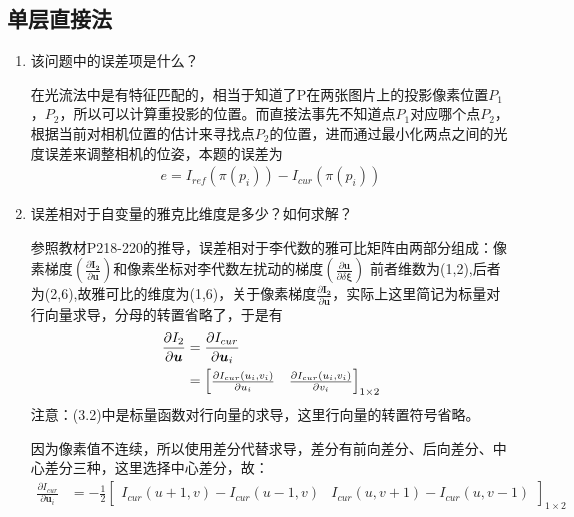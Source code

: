 \documentclass[40pt,a4paper，UTF8]{ctexart}
\numberwithin{equation}{section}
\begin{document}
\subsection{单层直接法}
\begin{enumerate}
\item 该问题中的误差项是什么？

在光流法中是有特征匹配的，相当于知道了P在两张图片上的投影像素位置$P_1$，$P_2$，所以可以计算重投影的位置。而直接法事先不知道点$P_1$对应哪个点$P_2$，根据当前对相机位置的估计来寻找点$P_2$的位置，进而通过最小化两点之间的光度误差来调整相机的位姿，本题的误差为
\begin{align}
e=I_{ref}(\pi (p_i))-I_{cur}(\pi (p_i))
\end{align}

\item 误差相对于自变量的雅克比维度是多少？如何求解？

参照教材P218-220的推导，误差相对于李代数的雅可比矩阵由两部分组成：像素梯度$(\frac{\partial \bm{I_2}}{\partial \bm{u}})$和像素坐标对李代数左扰动的梯度$(\frac{\partial \bm u}{\partial \delta \bm \xi})$
前者维数为(1,2),后者为(2,6),故雅可比的维度为(1,6)，关于像素梯度$\frac{\partial \bm{I_2}}{\partial \bm{u}}$，实际上这里简记为标量对行向量求导，分母的转置省略了，于是有
\begin{align}
\frac{\partial I_2}{\partial \bm{u}} &= 
\frac{\partial  I_{cur}}{\partial \bm u_i} \notag \\ 
&=
\begin{bmatrix}
\frac{\partial I_{cur}(u_i,v_i)}{\partial u_i} &
\frac{\partial I_{cur}(u_i,v_i)}{\partial v_i}
\end{bmatrix}_{1\times 2}
\end{align}
注意：(3.2)中是标量函数对行向量的求导，这里行向量的转置符号省略。

因为像素值不连续，所以使用差分代替求导，差分有前向差分、后向差分、中心差分三种，这里选择中心差分，故：
\begin{align}
\frac{\partial  I_{cur}}{\partial \bm u_i} &= 
-\frac{1}{2}
\begin{bmatrix}
I_{cur}(u+1,v)-I_{cur}(u-1,v) & I_{cur}(u,v+1)-I_{cur}(u,v-1)
\end{bmatrix}_{1\times 2}
\end{align}


\end{enumerate}
\end{document}
